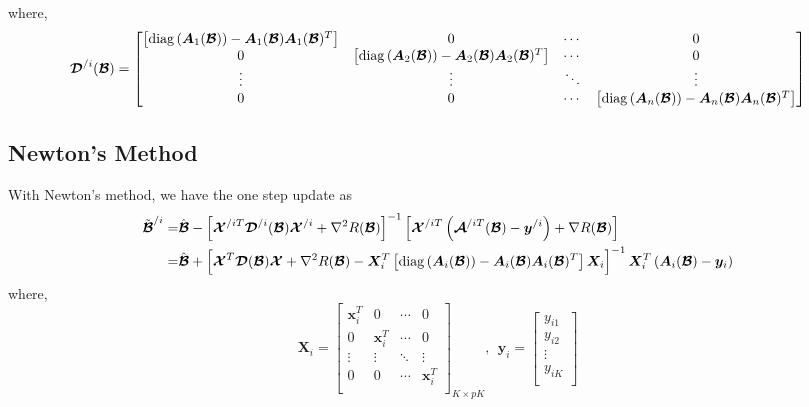 \documentclass[letter]{article}
\begin{document}
	where,
	$$\bm{\mathcal{D}}^{/i}(\bm{\mathcal{B}})=\begin{bmatrix}
	\left[{\rm diag}\left(\bm{A}_1(\bm{\mathcal{B}})\right)-\bm{A}_1(\bm{\mathcal{B}})\bm{A}_1(\bm{\mathcal{B}})^T\right] & 0 & \cdots & 0 \\
	0 & \left[{\rm diag}\left(\bm{A}_2(\bm{\mathcal{B}})\right)-\bm{A}_2(\bm{\mathcal{B}})\bm{A}_2(\bm{\mathcal{B}})^T\right] & \cdots & 0 \\
	\vdots & \vdots & \ddots & \vdots \\
	0 & 0 & \cdots & \left[{\rm diag}\left(\bm{A}_n(\bm{\mathcal{B}})\right)-\bm{A}_n(\bm{\mathcal{B}})\bm{A}_n(\bm{\mathcal{B}})^T\right] \\
	\end{bmatrix}$$
	
	\subsection{Newton's Method}
	
	With Newton's method, we have the one step update as
	$$\begin{aligned}
	\tilde{\bm{\mathcal{B}}}^{/i}=&
	\hat{\bm{\mathcal{B}}}-\left[\bm{\mathcal{X}}^{/iT}
	\bm{\mathcal{D}}^{/i}(\bm{\mathcal{B}})\bm{\mathcal{X}}^{/i}+\nabla^2R(\bm{\mathcal{B}})\right]^{-1}\left[\bm{\mathcal{X}}^{/iT}\left(\bm{\mathcal{A}}^{/iT}(\bm{\mathcal{B}})-\bm{y}^{/i}\right)+\nabla R(\bm{\mathcal{B}})\right] \\
	=&\hat{\bm{\mathcal{B}}}+\left[\bm{\mathcal{X}}^T
	\bm{\mathcal{D}}(\bm{\mathcal{B}})\bm{\mathcal{X}}+\nabla^2R(\bm{\mathcal{B}})-\bm{X}_i^T\left[{\rm diag}\left(\bm{A}_i(\bm{\mathcal{B}})\right)-\bm{A}_i(\bm{\mathcal{B}})\bm{A}_i(\bm{\mathcal{B}})^T\right]\bm{X}_i\right]^{-1}\bm{X}_i^T\left(\bm{A}_i(\bm{\mathcal{B}})-\bm{y}_i\right) \\
	\end{aligned}$$
	where,
	$$\bm{X}_i=
	\begin{bmatrix}
	\bm{x}_i^T & 0 & \cdots & 0 \\
	0 & \bm{x}_i^T & \cdots & 0 \\
	\vdots & \vdots & \ddots & \vdots \\
	0 & 0 & \cdots & \bm{x}_i^T \\
	\end{bmatrix}_{K\times pK},\ \ 
	\bm{y}_i=\begin{bmatrix}
	y_{i1} \\
	y_{i2} \\
	\vdots \\
	y_{iK} \\
	\end{bmatrix}$$
	\\
	
\end{document}
